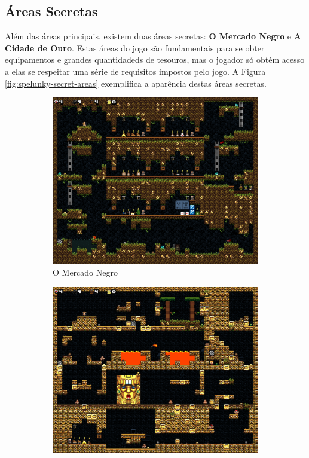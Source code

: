 \subsection{Áreas Secretas}
Além das áreas principais, existem duas áreas secretas: \textbf{O Mercado Negro}
e \textbf{A Cidade de Ouro}. Estas áreas do jogo são fundamentais para se obter
equipamentos e grandes quantidadeds de tesouros, mas o jogador só obtém acesso a
elas se respeitar uma série de requisitos impostos pelo jogo. A Figura
\ref{fig:spelunky-secret-areas} exemplifica a aparência destas áreas secretas.

\begin{figure}[htb!]
\centering
	\begin{subfigure}[b]{0.4\textwidth}
		\includegraphics[width=\textwidth]{fig/spelunky-blackmarket.pdf}
		\caption{O Mercado Negro}
		\label{fig:spelunky-blackmarket}
	\end{subfigure}
	\begin{subfigure}[b]{0.4\textwidth}
		\includegraphics[width=\textwidth]{fig/spelunky-cityofgold.pdf}

\end{subfigure}
\end{figure}
